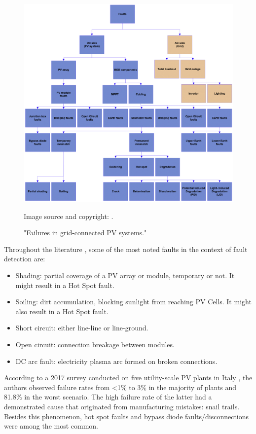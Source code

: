 \begin{figure}[h!]
    \centering
    \includegraphics[width=14cm]{figures/chapter2/faults.png} \caption{"Failures in grid-connected PV systems."} Image source and copyright: \cite{Pillai2018}.
    \label{fig:faults}
\end{figure}

Throughout the literature \cite{Braun2011}, some of the most noted faults in the context of fault detection are:

\begin{itemize}
    \item Shading: partial coverage of a PV array or module, temporary or not. It might result in a Hot Spot fault.
    \item Soiling: dirt accumulation, blocking sunlight from reaching PV Cells. It might also result in a Hot Spot fault.
    \item Short circuit: either line-line or line-ground.
    \item Open circuit: connection breakage between modules.
    \item DC arc fault: electricity plasma arc formed on broken connections.
\end{itemize}

According to a 2017 survey conducted on five utility-scale PV plants in Italy \cite{Grimaccia2017}, the authors observed failure rates from <1\% to 3\% in the majority of plants and 81.8\% in the worst scenario. The high failure rate of the latter had a demonstrated cause that originated from manufacturing mistakes: snail trails. Besides this phenomenon, hot spot faults and bypass diode faults/disconnections were among the most common.

